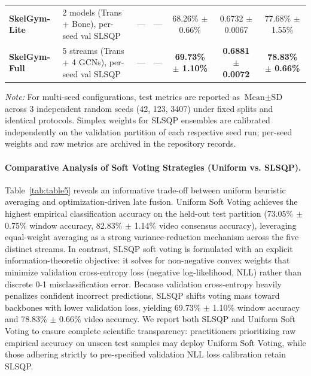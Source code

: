 \documentclass[runningheads]{llncs}
\begin{document}
\begin{table}[!t]
{\begin{tabular}{l l c c | c c c}
\textbf{SkelGym-Lite}       & 2 models (Trans + Bone), per-seed val SLSQP & --- & --- & 68.26\% $\pm$ 0.66\% & 0.6732 $\pm$ 0.0067 & 77.68\% $\pm$ 1.55\% \\
\textbf{SkelGym-Full}       & 5 streams (Trans + 4 GCNs), per-seed val SLSQP & --- & --- & \textbf{69.73\% $\pm$ 1.10\%} & \textbf{0.6881 $\pm$ 0.0072} & \textbf{78.83\% $\pm$ 0.66\%} \\
\bottomrule
\end{tabular}
}
\vspace{1mm}
\footnotesize{\textit{Note:} For multi-seed configurations, test metrics are reported as $\text{Mean} \pm \text{SD}$ across 3 independent random seeds (42, 123, 3407) under fixed splits and identical protocols. Simplex weights for SLSQP ensembles are calibrated independently on the validation partition of each respective seed run; per-seed weights and raw metrics are archived in the repository records.}
\end{table}

\paragraph{Comparative Analysis of Soft Voting Strategies (Uniform vs. SLSQP).} 
Table~\ref{tab:table5} reveals an informative trade-off between uniform heuristic averaging and optimization-driven late fusion. Uniform Soft Voting achieves the highest empirical classification accuracy on the held-out test partition (73.05\% $\pm$ 0.75\% window accuracy, 82.83\% $\pm$ 1.14\% video consensus accuracy), leveraging equal-weight averaging as a strong variance-reduction mechanism across the five distinct streams. In contrast, SLSQP soft voting is formulated with an explicit information-theoretic objective: it solves for non-negative convex weights that minimize validation cross-entropy loss (negative log-likelihood, NLL) rather than discrete 0-1 misclassification error. Because validation cross-entropy heavily penalizes confident incorrect predictions, SLSQP shifts voting mass toward backbones with lower validation loss, yielding 69.73\% $\pm$ 1.10\% window accuracy and 78.83\% $\pm$ 0.66\% video accuracy. We report both SLSQP and Uniform Soft Voting to ensure complete scientific transparency: practitioners prioritizing raw empirical accuracy on unseen test samples may deploy Uniform Soft Voting, while those adhering strictly to pre-specified validation NLL loss calibration retain SLSQP.
\end{document}
